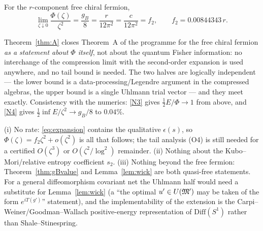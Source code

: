 \documentclass[11pt]{article}
\begin{document}
\begin{theorem}\label{thm:A}
For the $r$-component free chiral fermion,
\begin{equation}\label{eq:A}
 \boxed{\ \lim_{\zeta\downarrow0}\frac{\Phi(\zeta)}{\zeta^2}=\frac{g_B}8=\frac r{12\pi^2}
 =\frac c{12\pi^2}=f_2 ,\qquad f_2=0.00844343\,r .\ }
\end{equation}
\end{theorem}

\begin{verdictok}
Theorem~\ref{thm:A} closes Theorem~A of the programme for the free chiral fermion \emph{as a statement
about $\Phi$ itself}, not about the quantum Fisher information: no interchange of the compression
limit with the second-order expansion is used anywhere, and no tail bound is needed.  The two halves
are logically independent --- the lower bound is a data-processing/Legendre argument in the
compressed algebras, the upper bound is a single Uhlmann trial vector --- and they meet exactly.
Consistency with the numerics: \ref{N3} gives $\frac12E/\Phi\to1$ from above, and \ref{N4} gives
$\frac12\inf E/\zeta^2\to g_B/8$ to $0.04\%$.
\end{verdictok}

\begin{remark}\label{rem:notgive}
(i) No rate: \eqref{eq:expansion} contains the qualitative $\epsilon(s)$, so
$\Phi(\zeta)=f_2\zeta^2+o(\zeta^2)$ is all that follows; the tail analysis (O4) is still needed for a
certified $O(\zeta^3)$ or $O(\zeta^2/\log^2)$ remainder.  (ii) Nothing about the Kubo--Mori/relative
entropy coefficient $s_2$.  (iii) Nothing beyond the free fermion: Theorem~\ref{thm:gBvalue} and
Lemma~\ref{lem:wick} are both quasi-free statements.  For a general diffeomorphism covariant net the
Uhlmann half would need a substitute for Lemma~\ref{lem:wick} (a ``the optimal $u'\in U(\mathfrak M')$ may be
taken of the form $e^{iT(g')}$'' statement), and the implementability of the extension is the
Carpi--Weiner/Goodman--Wallach positive-energy representation of $\mathrm{Diff}(S^1)$ rather than
Shale--Stinespring.
\end{remark}
\end{document}
